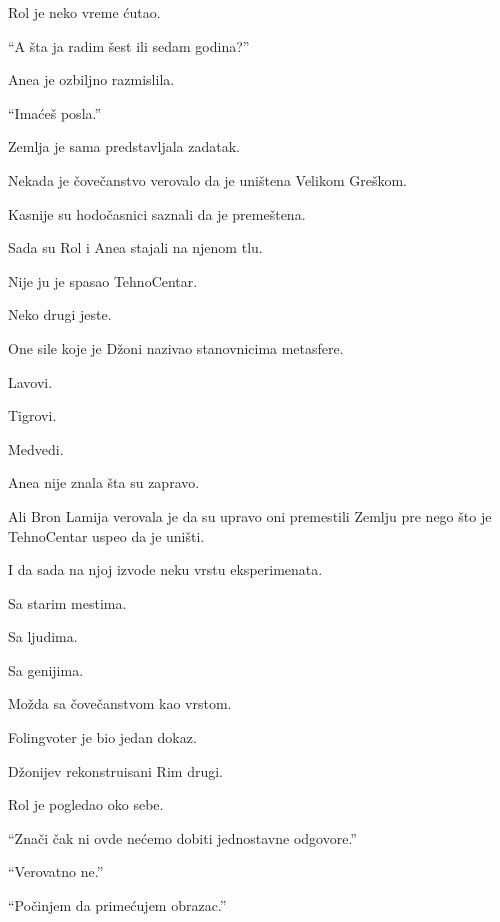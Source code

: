 Rol je neko vreme ćutao.

``A šta ja radim šest ili sedam godina?''

\bigskip

Anea je ozbiljno razmislila.

``Imaćeš posla.''

\bigskip

Zemlja je sama predstavljala zadatak.

\bigskip

Nekada je čovečanstvo verovalo da je uništena Velikom Greškom.

Kasnije su hodočasnici saznali da je premeštena.

Sada su Rol i Anea stajali na njenom tlu.

\bigskip

Nije ju je spasao TehnoCentar.

\bigskip

Neko drugi jeste.

\bigskip

One sile koje je Džoni nazivao stanovnicima metasfere.

Lavovi.

Tigrovi.

Medvedi.

\bigskip

Anea nije znala šta su zapravo.

Ali Bron Lamija verovala je da su upravo oni premestili Zemlju pre nego što je TehnoCentar uspeo da je uništi.

\bigskip

I da sada na njoj izvode neku vrstu eksperimenata.

\bigskip

Sa starim mestima.

Sa ljudima.

Sa genijima.

Možda sa čovečanstvom kao vrstom.

\bigskip

Folingvoter je bio jedan dokaz.

Džonijev rekonstruisani Rim drugi.

\bigskip

Rol je pogledao oko sebe.

``Znači čak ni ovde nećemo dobiti jednostavne odgovore.''

``Verovatno ne.''

``Počinjem da primećujem obrazac.''

\bigskip


